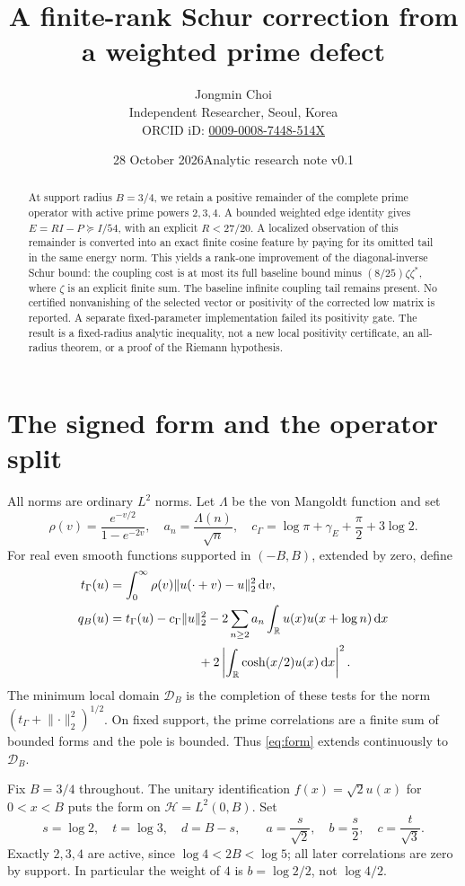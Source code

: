 \documentclass[11pt]{article}
\title{A finite-rank Schur correction from a weighted prime defect}
\author{Jongmin Choi\\Independent Researcher, Seoul, Korea\\
ORCID iD: \href{https://orcid.org/0009-0008-7448-514X}{0009-0008-7448-514X}}
\date{28 October 2026\quad Analytic research note v0.1}
\newcommand{\R}{\mathbb R}
\newcommand{\dd}{\,\mathrm d}
\newcommand{\norm}[1]{\lVert#1\rVert}
\newcommand{\HH}{\mathcal H}
\begin{document}
\maketitle
\begin{abstract}
At support radius $B=3/4$, we retain a positive remainder of the complete prime operator with active prime powers $2,3,4$. A bounded weighted edge identity gives $E=RI-P\succeq I/54$, with an explicit $R<27/20$. A localized observation of this remainder is converted into an exact finite cosine feature by paying for its omitted tail in the same energy norm. This yields a rank-one improvement of the diagonal-inverse Schur bound: the coupling cost is at most its full baseline bound minus $(8/25)\zeta\zeta^*$, where $\zeta$ is an explicit finite sum. The baseline infinite coupling tail remains present. No certified nonvanishing of the selected vector or positivity of the corrected low matrix is reported. A separate fixed-parameter implementation failed its positivity gate. The result is a fixed-radius analytic inequality, not a new local positivity certificate, an all-radius theorem, or a proof of the Riemann hypothesis.
\end{abstract}

\section{The signed form and the operator split}
All norms are ordinary $L^2$ norms. Let $\Lambda$ be the von Mangoldt function and set
\[
 \rho(v)=\frac{e^{-v/2}}{1-e^{-2v}},\quad a_n=\frac{\Lambda(n)}{\sqrt n},\quad
 c_\Gamma=\log\pi+\gamma_E+\frac\pi2+3\log2.
\]
For real even smooth functions supported in $(-B,B)$, extended by zero, define
\begin{align}
 t_\Gamma(u)&=\int_0^\infty\rho(v)\norm{u(\cdot+v)-u}_2^2\dd v,\label{eq:gamma}\\
 q_B(u)&=t_\Gamma(u)-c_\Gamma\norm u_2^2
 -2\sum_{n\ge2}a_n\int_\R u(x)u(x+\log n)\dd x\nonumber\\
 &\hspace{25mm}+2\left|\int_\R\cosh(x/2)u(x)\dd x\right|^2.\label{eq:form}
\end{align}
The minimum local domain $\mathcal D_B$ is the completion of these tests for the norm $(t_\Gamma+\norm{\cdot}_2^2)^{1/2}$. On fixed support, the prime correlations are a finite sum of bounded forms and the pole is bounded. Thus \eqref{eq:form} extends continuously to $\mathcal D_B$.

Fix $B=3/4$ throughout. The unitary identification $f(x)=\sqrt2u(x)$ for $0<x<B$ puts the form on $\HH=L^2(0,B)$. Set
\[
 s=\log2,\quad t=\log3,\quad d=B-s,\qquad
 a=\frac{s}{\sqrt2},\quad b=\frac{s}{2},\quad c=\frac{t}{\sqrt3}.
\]
Exactly $2,3,4$ are active, since $\log4<2B<\log5$; all later correlations are zero by support. In particular the weight of $4$ is $b=\log2/2$, not $\log4/2$.
\end{document}
